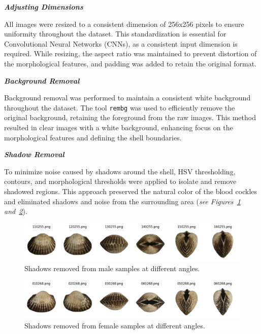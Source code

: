 \textbf{\textit{Adjusting Dimensions}}

All images were resized to a consistent dimension of 256x256 pixels to ensure uniformity throughout the dataset. This standardization is essential for Convolutional Neural Networks (CNNs), as a consistent input dimension is required. While resizing, the aspect ratio was maintained to prevent distortion of the morphological features, and padding was added to retain the original format.

\textbf{\textit{Background Removal}}

Background removal was performed to maintain a consistent white background throughout the dataset. The tool \texttt{rembg} was used to efficiently remove the original background, retaining the foreground from the raw images. This method resulted in clear images with a white background, enhancing focus on the morphological features and defining the shell boundaries.

\textbf{\textit{Shadow Removal}}

To minimize noise caused by shadows around the shell, HSV thresholding, contours, and morphological thresholds were applied to isolate and remove shadowed regions. This approach preserved the natural color of the blood cockles and eliminated shadows and noise from the surrounding area (\textit{see Figures~\ref{fig:m_noshadow} and~\ref{fig:f_noshadow}}).

\begin{figure}[h]
	\centering
	\includegraphics[width=\textwidth]{figures/male_shadows_removed.png}
	\caption{Shadows removed from male samples at different angles.}
	\label{fig:m_noshadow}
\end{figure}

\begin{figure}[h]
	\centering
	\includegraphics[width=\textwidth]{figures/female_shadows_removed.png}
	\caption{Shadows removed from female samples at different angles.}
	\label{fig:f_noshadow}
\end{figure}

